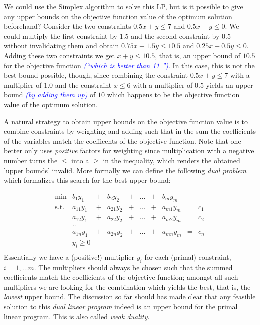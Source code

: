 \documentclass{article}
\begin{document}
We could use the Simplex algorithm to solve this LP, but is it possible to give any upper bounds on the objective function value of the optimum solution beforehand?
Consider the two constraints $0.5x+y\leq 7$ and $0.5x-y\leq 0$. We could multiply the first constraint
by $1.5$ and the second constraint by $0.5$ without invalidating them and obtain $0.75x+1.5y\leq 10.5$ and $0.25x-0.5y\leq 0$. Adding these two constraints we get $x+y\leq 10.5$, that is, an upper bound of $10.5$ for the objective function \textcolor{blue}{\emph{(``which is better than 11 '')}}. In this case, this is not the best bound possible, though, since combining
the constraint $0.5x+y\leq 7$ with a multiplier of $1.0$ and the constraint $x\leq 6$ with a multiplier of $0.5$ yields an upper bound \textcolor{blue}{\emph{(by adding them up)}} of $10$ which happens to be the objective function value of the optimum solution.

A natural strategy to obtain upper bounds on the objective function value is to combine constraints by weighting and adding such that in the sum the coefficients of the variables match the coefficents of the objective function. Note that one better only uses \emph{positive} factors for weighting since multiplication with a negative number turns the $\leq$ into a $\geq$ in the inequality, which renders the obtained 'upper bounds' invalid. More formally we can define the following \emph{dual problem} which formalizes this search for the best upper bound:

\[
\begin{matrix}
	\min& b_1 y_1 &+& b_2 y_2 &+& \dots &+& b_m y_m&&\\  
	\mbox{s.t.}	& a_{11} y_1 &+& a_{21} y_2&+& \dots &+&a_{m1} y_m&=&c_1\\
			& a_{12} y_1 &+& a_{22} y_2&+& \dots &+&a_{m2} y_m&=&c_2\\
			& ..	&&&&&&&&\\
			& a_{1n} y_1 &+& a_{2n} y_2&+& \dots &+&a_{mn} y_m&=&c_n\\
			& y_i\geq 0\\
\end{matrix}
\]
Essentially we have a (positive!) multiplier $y_i$ for each (primal) constraint, $i=1,\dots m$. The multipliers should always be chosen such that the summed coefficients match the coefficients of the objective function; amongst all such multipliers we are looking for the combination which yields the best, that is, the \emph{lowest} upper bound. The discussion so far should has made clear that any feasible solution to this \emph{dual linear program} indeed is an upper bound for the primal linear program. This is also called \emph{weak duality}.
\end{document}
